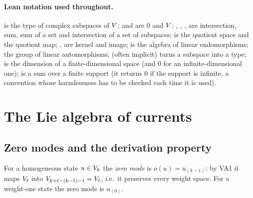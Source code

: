 \paragraph{Lean notation used throughout.}  is the type of complex subspaces
of $V$;  and  are $0$ and $V$; , , ,
 are intersection, sum, sum of a set and intersection of a set of subspaces;
 is the quotient space and  the quotient map; ,
 are kernel and image;  is the algebra of linear
endomorphisms;  the group of linear automorphisms;  (often implicit)
turns a subspace into a type;  is the dimension of a finite-dimensional
space (and $0$ for an infinite-dimensional one);  is a sum over a finite support (it
returns $0$ if the support is infinite, a convention whose harmlessness has to be checked each
time it is used).

\section{The Lie algebra of currents}\label{l04:sec:v1}

\subsection{Zero modes and the derivation property}

For a homogeneous state $u\in V_k$ the \emph{zero mode} is $o(u) = u_{(k-1)}$: by VA1 it
maps $V_\ell$ into $V_{k+\ell-(k-1)-1} = V_\ell$, i.e.\ it preserves every weight
space. For a weight-one state the zero mode is $u_{(0)}$.

